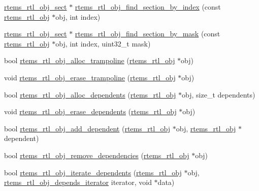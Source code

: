 \begin{DoxyCompactItemize}
\mbox{\hyperlink{structrtems__rtl__obj__sect}{rtems\+\_\+rtl\+\_\+obj\+\_\+sect}} $\ast$ \mbox{\hyperlink{rtl-obj_8c_ae3fee966abdcf542db13dfd3c75f8f1d}{rtems\+\_\+rtl\+\_\+obj\+\_\+find\+\_\+section\+\_\+by\+\_\+index}} (const \mbox{\hyperlink{structrtems__rtl__obj}{rtems\+\_\+rtl\+\_\+obj}} $\ast$obj, int index)
\item 
\mbox{\hyperlink{structrtems__rtl__obj__sect}{rtems\+\_\+rtl\+\_\+obj\+\_\+sect}} $\ast$ \mbox{\hyperlink{rtl-obj_8c_a99bc60fea183744d2e3553f517bc6d22}{rtems\+\_\+rtl\+\_\+obj\+\_\+find\+\_\+section\+\_\+by\+\_\+mask}} (const \mbox{\hyperlink{structrtems__rtl__obj}{rtems\+\_\+rtl\+\_\+obj}} $\ast$obj, int index, uint32\+\_\+t mask)
\item 
bool \mbox{\hyperlink{rtl-obj_8c_a825479a6a942b5b742d4e05d5e08ee81}{rtems\+\_\+rtl\+\_\+obj\+\_\+alloc\+\_\+trampoline}} (\mbox{\hyperlink{structrtems__rtl__obj}{rtems\+\_\+rtl\+\_\+obj}} $\ast$obj)
\item 
void \mbox{\hyperlink{rtl-obj_8c_a59b26b41ab6dacfe609d8c98c36e535a}{rtems\+\_\+rtl\+\_\+obj\+\_\+erase\+\_\+trampoline}} (\mbox{\hyperlink{structrtems__rtl__obj}{rtems\+\_\+rtl\+\_\+obj}} $\ast$obj)
\item 
bool \mbox{\hyperlink{rtl-obj_8c_a9877304c222a5c80f68936f814cb42b3}{rtems\+\_\+rtl\+\_\+obj\+\_\+alloc\+\_\+dependents}} (\mbox{\hyperlink{structrtems__rtl__obj}{rtems\+\_\+rtl\+\_\+obj}} $\ast$obj, size\+\_\+t dependents)
\item 
void \mbox{\hyperlink{rtl-obj_8c_aea8861e811c36196e95b439e33707484}{rtems\+\_\+rtl\+\_\+obj\+\_\+erase\+\_\+dependents}} (\mbox{\hyperlink{structrtems__rtl__obj}{rtems\+\_\+rtl\+\_\+obj}} $\ast$obj)
\item 
bool \mbox{\hyperlink{rtl-obj_8c_a4c2f2836262a4606efecf94f95ac0cd8}{rtems\+\_\+rtl\+\_\+obj\+\_\+add\+\_\+dependent}} (\mbox{\hyperlink{structrtems__rtl__obj}{rtems\+\_\+rtl\+\_\+obj}} $\ast$obj, \mbox{\hyperlink{structrtems__rtl__obj}{rtems\+\_\+rtl\+\_\+obj}} $\ast$dependent)
\item 
bool \mbox{\hyperlink{rtl-obj_8c_a6191736c9a9c8e4a585f2208838ba277}{rtems\+\_\+rtl\+\_\+obj\+\_\+remove\+\_\+dependencies}} (\mbox{\hyperlink{structrtems__rtl__obj}{rtems\+\_\+rtl\+\_\+obj}} $\ast$obj)
\item 
bool \mbox{\hyperlink{rtl-obj_8c_afeed317d7aadd6e3fcb4b86cf31dc270}{rtems\+\_\+rtl\+\_\+obj\+\_\+iterate\+\_\+dependents}} (\mbox{\hyperlink{structrtems__rtl__obj}{rtems\+\_\+rtl\+\_\+obj}} $\ast$obj, \mbox{\hyperlink{rtl-obj_8h_a1465c9202902dfd2416e1d1432dab052}{rtems\+\_\+rtl\+\_\+obj\+\_\+depends\+\_\+iterator}} iterator, void $\ast$data)

\end{DoxyCompactItemize}
